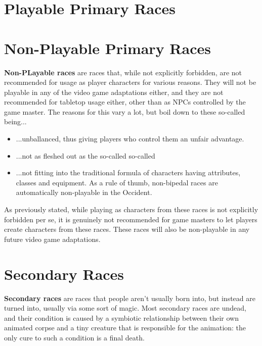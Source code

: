 \chapter{Playable Primary Races}













\chapter{Non-Playable Primary Races}
\textbf{Non-PLayable races} are races that, while not explicitly forbidden, are not recommended for usage as player characters for various reasons. They will not be playable in any of the video game adaptations either, and they are not recommended for tabletop usage either, other than as NPCs controlled by the game master. The reasons for this vary a lot, but boil down to these so-called  being...
\begin{itemize}
	\item ...unballanced, thus giving players who control them an unfair advantage.
	\item ...not as fleshed out as the so-called so-called 
	\item ...not fitting into the traditional formula of characters having attributes, classes and equipment. As a rule of thumb, non-bipedal races are automatically non-playable in the Occident.
\end{itemize}
As previously stated, while playing as characters from these races is not explicitly forbidden per se, it is genuinely not recommended for game masters to let players create characters from these races. These races will also be non-playable in any future video game adaptations.





\chapter{Secondary Races}
\textbf{Secondary races} are races that people aren't usually born into, but instead are turned into, usually via some sort of magic. Most secondary races are undead, and their condition is caused by a symbiotic relationship between their own animated corpse and a tiny creature that is responsible for the animation: the only cure to such a condition is a final death.



